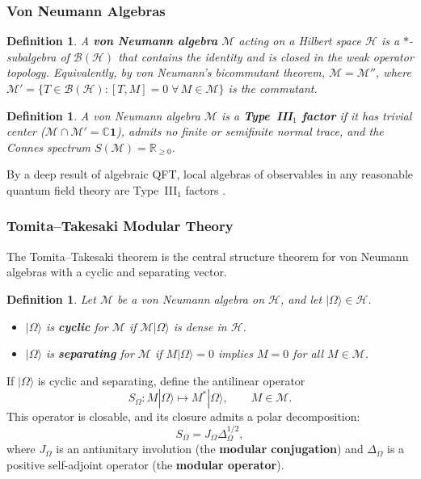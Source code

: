 \documentclass[12pt,a4paper,openany]{book}
\newtheorem{definition}[theorem]{Definition}
\begin{document}
\subsubsection{Von Neumann Algebras}

\begin{definition}
A \textbf{von Neumann algebra} $\mathcal{M}$ acting on a Hilbert space $\mathcal{H}$ is a $*$-subalgebra of $\mathcal{B}(\mathcal{H})$ that contains the identity and is closed in the weak operator topology.
Equivalently, by von Neumann's bicommutant theorem, $\mathcal{M} = \mathcal{M}''$, where $\mathcal{M}' = \{T \in \mathcal{B}(\mathcal{H}) : [T, M] = 0 \;\forall\, M \in \mathcal{M}\}$ is the commutant.
\end{definition}

\begin{definition}
A von Neumann algebra $\mathcal{M}$ is a \textbf{Type~III$_1$ factor} if it has trivial center ($\mathcal{M} \cap \mathcal{M}' = \mathbb{C} \mathbf{1}$), admits no finite or semifinite normal trace, and the Connes spectrum $S(\mathcal{M}) = \mathbb{R}_{\geq 0}$.
\end{definition}

By a deep result of algebraic QFT, local algebras of observables in any reasonable quantum field theory are Type~III$_1$ factors \cite{Haag1996, Yngvason2005}.

\subsubsection{Tomita--Takesaki Modular Theory}
\label{H-D-sec:TT}

The Tomita--Takesaki theorem is the central structure theorem for von Neumann algebras with a cyclic and separating vector.

\begin{definition}
Let $\mathcal{M}$ be a von Neumann algebra on $\mathcal{H}$, and let $|\Omega\rangle \in \mathcal{H}$.
\begin{itemize}
\item $|\Omega\rangle$ is \textbf{cyclic} for $\mathcal{M}$ if $\mathcal{M}|\Omega\rangle$ is dense in $\mathcal{H}$.
\item $|\Omega\rangle$ is \textbf{separating} for $\mathcal{M}$ if $M|\Omega\rangle = 0$ implies $M = 0$ for all $M \in \mathcal{M}$.
\end{itemize}
\end{definition}

If $|\Omega\rangle$ is cyclic and separating, define the antilinear operator
\begin{equation}
S_\Omega : M|\Omega\rangle \mapsto M^*|\Omega\rangle, \qquad M \in \mathcal{M}.
\end{equation}
This operator is closable, and its closure admits a polar decomposition:
\begin{equation}
S_\Omega = J_\Omega \Delta_\Omega^{1/2},
\end{equation}
where $J_\Omega$ is an antiunitary involution (the \textbf{modular conjugation}) and $\Delta_\Omega$ is a positive self-adjoint operator (the \textbf{modular operator}).
\end{document}
